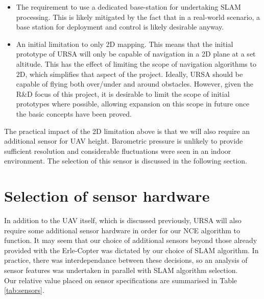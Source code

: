 \documentclass[capstone_report.tex]{subfiles}
\begin{document}
\begin{itemize}
 	\item The requirement to use a dedicated base-station for undertaking SLAM processing. This is likely mitigated by the fact that in a real-world scenario, a base station for deployment and control is likely desirable anyway.
 	\item An initial limitation to only 2D mapping. This means that the initial prototype of URSA will only be capable of navigation in a 2D plane at a set altitude. This has the effect of limiting the scope of navigation algorithms to 2D, which simplifies that aspect of the project. Ideally, URSA should be capable of flying both over/under and around obstacles. However, given the R\&D focus of this project, it is desirable to limit the scope of initial prototypes where possible, allowing expansion on this scope in future once the basic concepts have been proved.
\end{itemize}

The practical impact of the 2D limitation above is that we will also require an additional sensor for UAV height. Barometric pressure is unlikely to provide sufficient resolution and considerable fluctuations were seen in an indoor environment. The selection of this sensor is discussed in the following section. \\

\section{Selection of sensor hardware}
In addition to the UAV itself, which is discussed previously, URSA will also require some additional sensor hardware in order for our NCE algorithm to function. It may seem that our choice of additional sensors beyond those already provided with the Erle-Copter was dictated by our choice of SLAM algorithm. In practice, there was interdependance between these decisions, so an analysis of sensor features was undertaken in parallel with SLAM algorithm selection. \\

Our relative value placed on sensor specifications are summarised in Table \ref{tab:sensors}.
\end{document}
